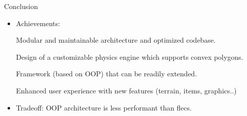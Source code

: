 
\begin{frame}{Conclusion}

    \begin{itemize}
        \item Achievements:
        \begin{multicols}{4}
            \begin{tcolorbox}[colback=boxcolor, colframe=boxcolor, width=0.235\textwidth, height=4.5cm, rounded corners]
                \centering
                Modular and maintainable architecture and optimized codebase.
            \end{tcolorbox}
            
            \begin{tcolorbox}[colback=boxcolor, colframe=boxcolor, width=0.235\textwidth, height=4.5cm, rounded corners]
                \centering
                Design of a customizable physics engine which supports convex polygons.
            \end{tcolorbox}
            
            \begin{tcolorbox}[colback=boxcolor, colframe=boxcolor, width=0.235\textwidth, height=4.5cm, rounded corners]
                \centering
                Framework (based on OOP) that can be readily extended.
            \end{tcolorbox}
            
            \begin{tcolorbox}[colback=boxcolor, colframe=boxcolor, width=0.235\textwidth, height=4.5cm, rounded corners]
                \centering
                Enhanced user experience with new features (terrain, items, graphics..)
            \end{tcolorbox}
        \end{multicols}
        \item Tradeoff: OOP architecture is less performant than flecs.
    \end{itemize}
\end{frame}

